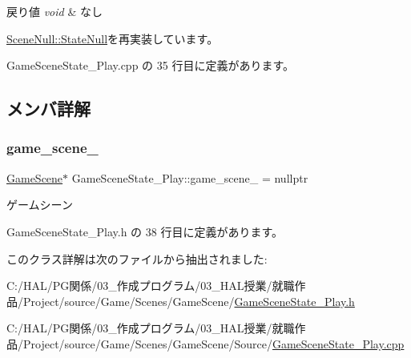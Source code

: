 \begin{DoxyRetVals}{戻り値}
{\em void} & なし \\
\hline
\end{DoxyRetVals}


\mbox{\hyperlink{class_scene_null_1_1_state_null_a835f82c22afb290eca79460450088baf}{Scene\+Null\+::\+State\+Null}}を再実装しています。



 Game\+Scene\+State\+\_\+\+Play.\+cpp の 35 行目に定義があります。



\subsection{メンバ詳解}
\mbox{\label{class_game_scene_state___play_aec1f62101eefe333d4da5a2a30ef21d2}} 
\subsubsection{\texorpdfstring{game\+\_\+scene\+\_\+}{game\_scene\_}}
{\footnotesize\ttfamily \mbox{\hyperlink{class_game_scene}{Game\+Scene}}$\ast$ Game\+Scene\+State\+\_\+\+Play\+::game\+\_\+scene\+\_\+ = nullptr\hspace{0.3cm}{\ttfamily [private]}}



ゲームシーン 



 Game\+Scene\+State\+\_\+\+Play.\+h の 38 行目に定義があります。



このクラス詳解は次のファイルから抽出されました\+:\begin{DoxyCompactItemize}
\item 
C\+:/\+H\+A\+L/\+P\+G関係/03\+\_\+作成プログラム/03\+\_\+\+H\+A\+L授業/就職作品/\+Project/source/\+Game/\+Scenes/\+Game\+Scene/\mbox{\hyperlink{_game_scene_state___play_8h}{Game\+Scene\+State\+\_\+\+Play.\+h}}\item 
C\+:/\+H\+A\+L/\+P\+G関係/03\+\_\+作成プログラム/03\+\_\+\+H\+A\+L授業/就職作品/\+Project/source/\+Game/\+Scenes/\+Game\+Scene/\+Source/\mbox{\hyperlink{_game_scene_state___play_8cpp}{Game\+Scene\+State\+\_\+\+Play.\+cpp}}\end{DoxyCompactItemize}
